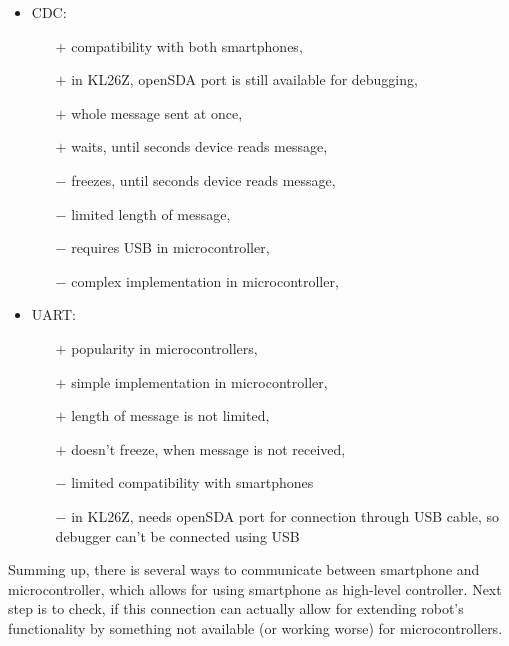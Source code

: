 \begin{itemize}
  \item CDC:
  	\begin{itemize}
  	  \item[$+$] compatibility with both smartphones, 
  	  \item[$+$] in KL26Z, openSDA port is still available for debugging, 
  	  \item[$+$] whole message sent at once, 
  	  \item[$+$] waits, until seconds device reads message,  
  	  \item[$-$] freezes, until seconds device reads message, 
  	  \item[$-$] limited length of message,
  	  \item[$-$] requires USB in microcontroller, 
  	  \item[$-$] complex implementation in microcontroller, 
  	\end{itemize}
  \item UART:
  	\begin{itemize}
  	  \item[$+$] popularity in microcontrollers,
  	  \item[$+$] simple implementation in microcontroller,
  	  \item[$+$] length of message is not limited,
  	  \item[$+$] doesn't freeze, when message is not received,
  	  \item[$-$] limited compatibility with smartphones
  	  \item[$-$] in KL26Z, needs openSDA port for connection through USB cable,
  	 	so debugger can't be connected using USB
  	\end{itemize}
\end{itemize}

Summing up, there is several ways to communicate between smartphone and
microcontroller, which allows for using smartphone as high-level controller.
Next step is to check, if this connection can actually allow for extending
robot's functionality by something not available (or working worse) for
microcontrollers.
